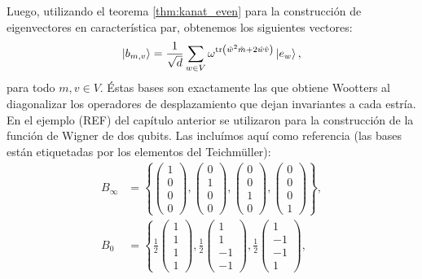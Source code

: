 \documentclass[a4paper]{report}
\DeclareMathOperator{\tr}{tr}
\begin{document}
  Luego, utilizando el teorema \ref{thm:kanat_even} para la
  construcción de eigenvectores en característica par,
  obtenemos los siguientes vectores:
  \[
    \ket{b_{m,v}}
    = \frac{1}{\sqrt{d}}
    \sum_{w \in V}^{}
    \omega^{\tr\left(
      \hat w^2 \hat m + 2 \hat w \hat v
    \right) } \ket{e_w},
  \] 
  para todo $m,v \in V$. Éstas bases son exactamente las que
  obtiene Wootters al diagonalizar los operadores de
  desplazamiento que dejan invariantes a cada estría. En el
  ejemplo (REF) del capítulo anterior se utilizaron para la
  construcción de la función de Wigner de dos qubits. Las
  incluímos aquí como referencia (las bases están
  etiquetadas por los elementos del Teichmüller):
  \begin{align}
    B_\infty &= \left\{
    \begin{pmatrix} 1\\0\\0\\0 \end{pmatrix},
    \begin{pmatrix} 0\\1\\0\\0 \end{pmatrix},
    \begin{pmatrix} 0\\0\\1\\0 \end{pmatrix},
    \begin{pmatrix} 0\\0\\0\\1 \end{pmatrix}
    \right\}, \\
    B_0 &= \left\{
    \frac{1}{2} \begin{pmatrix} 1\\1\\1\\1 \end{pmatrix}, 
    \frac{1}{2} \begin{pmatrix} 1\\1\\-1\\-1 \end{pmatrix}, 
    \frac{1}{2} \begin{pmatrix} 1\\-1\\-1\\1 \end{pmatrix},

\end{align}
\end{document}
